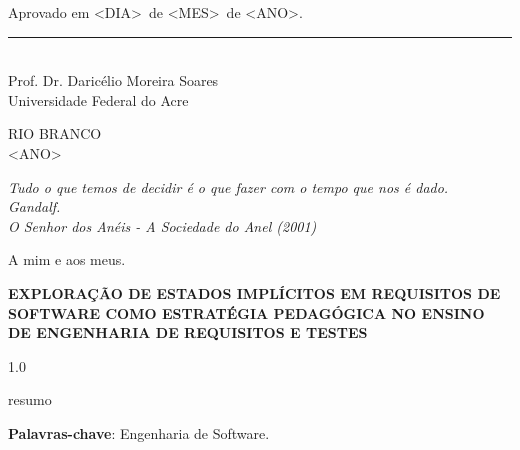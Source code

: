 \documentclass[ruledheader]{abnt_UFF}[abntex2]
\newcommand{\meutitulo}{EXPLORAÇÃO DE ESTADOS IMPLÍCITOS EM REQUISITOS DE SOFTWARE COMO ESTRATÉGIA PEDAGÓGICA NO ENSINO DE ENGENHARIA DE REQUISITOS E TESTES}
\newcommand{\meuorientador}{Prof. Dr. Daricélio Moreira Soares}
\newcommand{\meuano}{<ANO>}
\newcommand{\meumes}{<MES>}
\newcommand{\meudia}{<DIA>}
\begin{document}
	\vspace{1.0 cm}
	\noindent
	
	Aprovado em \meudia\ de \meumes\ de \meuano. \\
	\begin{flushright}
	  \parbox{11cm}
	  {
	    \begin{center}
	      \vspace{6mm}
	      \rule{11cm}{.1mm} \\
	      \meuorientador\\
	      Universidade Federal do Acre
	      \vspace{6mm}
	    \end{center}
	  }
	\end{flushright}
	
	\begin{center}
	  \vspace{4mm}
	  RIO BRANCO \\
	  \meuano
	\end{center}
	
	\cleardoublepage
	\thispagestyle{empty}
	\vspace*{200mm}
	
	\begin{flushright}
	  {\em
	    Tudo o que temos de decidir é o que fazer com o tempo que nos é dado.
	    \\
	    Gandalf.
	    \\ 
	    O Senhor dos Anéis - A Sociedade do Anel (2001)
	  }
	\end{flushright}
	\newpage
	
	\hspace{5mm}
	
	A mim e aos meus.
	
	\begin{resumo}
	
	  \begin{center}{
	    \textbf{\meutitulo}}
	  \end{center}
	
	\begin{spacing}{1.0}\noindent

        resumo
    
	\end{spacing}
	{\hspace{-8mm} \bf{Palavras-chave}}: Engenharia de Software.
	
	\end{resumo}
	
\end{document}
